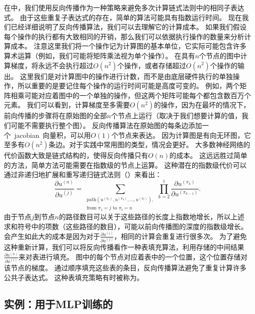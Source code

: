   
在中，我们使用反向传播作为一种策略来避免多次计算链式法则中的相同子表达式。
由于这些重复子表达式的存在，简单的算法可能具有指数运行时间。
现在我们已经详细说明了反向传播算法，我们可以去理解它的计算成本。
如果我们假设每个操作的执行都有大致相同的开销，那么我们可以依据执行操作的数量来分析计算成本。
注意这里我们将一个操作记为计算图的基本单位，它实际可能包含许多算术运算（例如，我们可能将矩阵乘法视为单个操作）。
在具有$n$个节点的图中计算梯度，将永远不会执行超过$O(n^2)$个操作，或者存储超过$O(n^2)$个操作的输出。
这里我们是对计算图中的操作进行计数，而不是由底层硬件执行的单独操作，所以重要的是要记住每个操作的运行时间可能是高度可变的。
例如，两个矩阵相乘可能对应着图中的一个单独的操作，但这两个矩阵可能每个都包含数百万个元素。
我们可以看到，计算梯度至多需要$O(n^2)$的操作，因为在最坏的情况下，前向传播的步骤将在原始图的全部$n$个节点上运行（取决于我们想要计算的值，我们可能不需要执行整个图）。
反向传播算法在原始图的每条边添加一个~\gls{jacobian}~向量积，可以用$O(1)$个节点来表达。
因为计算图是有向无环图，它至多有$O(n^2)$条边。对于实践中常用图的类型，情况会更好。
大多数神经网络的代价函数大致是链式结构的，使得反向传播只有$O(n)$的成本。
这远远胜过简单的方法，简单方法可能需要在指数级的节点上运算。
这种潜在的指数级代价可以通过非递归地扩展和重写递归链式法则（）来看出：
\begin{equation}
  \frac{\partial u^{(n)}}{\partial u^{(j)}} =
  \sum_{\substack{\text{path}(u^{(\pi_1)}, u^{(\pi_2)}, \ldots, u^{(\pi_t)}  ),\\ \text{from } \pi_1=j \text{ to }\pi_t = n}}
  \prod_{k=2}^t \frac{\partial u^{(\pi_k)}}{\partial u^{(\pi_{k-1})}}.
\end{equation}
由于节点$j$到节点$n$的路径数目可以关于这些路径的长度上指数地增长，所以上述求和符号中的项数（这些路径的数目），可能以前向传播图的深度的指数级增长。
会产生如此大的成本是因为对于$\frac{\partial u^{(i)}}{\partial u^{(j)}}$，相同的计算会重复进行很多次。
为了避免这种重新计算，我们可以将反向传播看作一种表填充算法，利用存储的中间结果$\frac{\partial u^{(n)}}{\partial u^{(i)}}$来对表进行填充。
图中的每个节点对应着表中的一个位置，这个位置存储对该节点的梯度。
通过顺序填充这些表的条目，反向传播算法避免了重复计算许多公共子表达式。
这种表填充策略有时被称为。
  
  
\subsection{实例：用于MLP训练的}
\label{sec:example_back_propagation_for_mlp_training}

